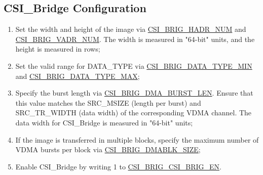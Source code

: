 \documentclass[main\_\_EN.tex]{subfiles}
\begin{document}
\subsection{CSI\_Bridge Configuration}
\label{sec:isp_csi_bridge_proc}
\begin{enumerate}
    \item Set the width and height of the image via \hyperref[fielddesc:CSIBRIGHADRNUM]{CSI\_BRIG\_HADR\_NUM} and \hyperref[fielddesc:CSIBRIGVADRNUM]{CSI\_BRIG\_VADR\_NUM}. The width is measured in "64-bit" units, and the height is measured in rows;

    \item Set the valid range for DATA\_TYPE via \hyperref[fielddesc:CSIBRIGDATATYPEMIN]{CSI\_BRIG\_DATA\_TYPE\_MIN} and \hyperref[fielddesc:CSIBRIGDATATYPEMAX]{CSI\_BRIG\_DATA\_TYPE\_MAX};

    \item Specify the burst length via \hyperref[fielddesc:CSIBRIGDMABURSTLEN]{CSI\_BRIG\_DMA\_BURST\_LEN}. Ensure that this value matches the SRC\_MSIZE (length per burst) and SRC\_TR\_WIDTH (data width) of the corresponding VDMA channel. The data width for CSI\_Bridge is measured in "64-bit" units;

    \item If the image is transferred in multiple blocks, specify the maximum number of VDMA bursts per block via \hyperref[fielddesc:CSIBRIGDMABLKSIZE]{CSI\_BRIG\_DMABLK\_SIZE};

    \item Enable CSI\_Bridge by writing 1 to \hyperref[fielddesc:CSIBRIGCSIBRIGEN]{CSI\_BRIG\_CSI\_BRIG\_EN}.
\end{enumerate}
\end{document}
